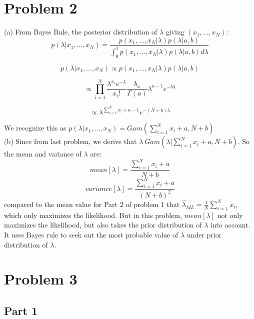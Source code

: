 \documentclass{article}
\begin{document}
\section{Problem 2}
(a) From Bayes Rule, the posterior distribution of $\lambda$ giving $(x_1,...,x_N)$:\\
$$ p(\lambda|x_1,...,x_N) = \frac{p(x_1,...,x_N|\lambda)p(\lambda|a,b)}{\int_0^1{p(x_1,...,x_N|\lambda)p(\lambda|a,b)}d\lambda } $$

$$ p(\lambda|x_1,...,x_N) \propto p(x_1,...,x_N|\lambda)p(\lambda|a,b) $$

$$  \propto \prod_{i=1}^{N}\frac{\lambda^{x_i}e^{-\lambda}}{{x_i}!}   \frac{b_a}{\Gamma(a)}\lambda^{a-1}e^{-b\lambda}$$

$$\propto \lambda^{\sum_{i=1}^{N}x_i+a-1}e^{-(N+b)\lambda}
$$

We recognize this as $p(\lambda|x_1,...,x_N) = Gam(\displaystyle \sum_{i=1}^{N}x_i+a, N+b )$\\
(b) Since from last problem, we derive that $\lambda ~ Gam(\lambda|\displaystyle \sum_{i=1}^{N}x_i+a, N+b )$. So the mean and variance of $\lambda$ are:\\
$$ mean [\lambda] = \frac{ \sum_{i=1}^{N}x_i+a}{N+b}$$
$$ variance[\lambda] = \frac{ \sum_{i=1}^{N}x_i+a}{(N+b)^2}$$
compared to the mean value for Part 2 of problem 1 that $\hat{\lambda}_{ML} = \frac{1}{N} \sum_{i=1}^{N}x_i$, which only maximizes the likelihood. But in this problem, $ mean [\lambda] $ not only maximizes the likelihood, but also takes the prior distribution of $\lambda$ into account. It uses Bayes rule to seek out the most probable value of $\lambda$ under prior distribution of $\lambda$.

\section{Problem 3}
\subsection{Part 1}
\end{document}

